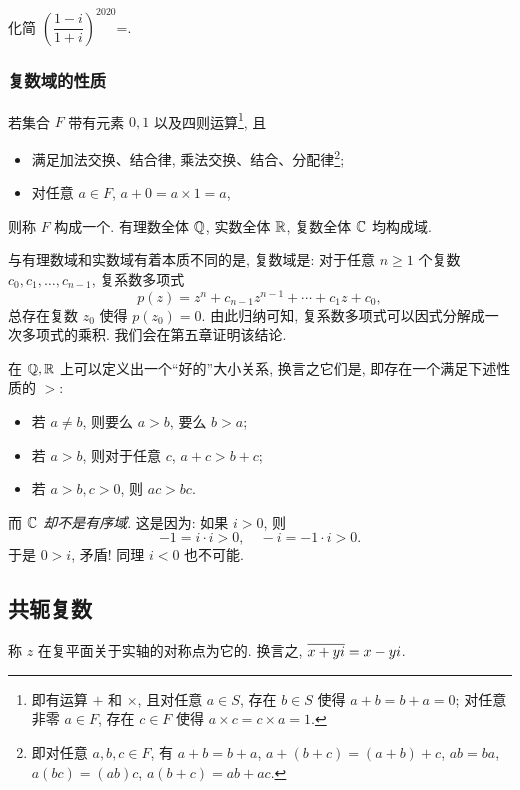 \begin{exercise}
  化简 $\left(\dfrac{1-i}{1+i}\right)^{2020}$=\fillblank{}.
\end{exercise}

\subsubsection{复数域的性质\optional}

若集合 $F$ 带有元素 $0,1$ 以及四则运算\footnote{%
  即有运算 $+$ 和 $\times$, 且对任意 $a\in S$, 存在 $b\in S$ 使得 $a+b=b+a=0$; 对任意非零 $a\in F$, 存在 $c\in F$ 使得 $a\times c=c\times a=1$.%
}, 且
\begin{itemize}
  \item 满足加法交换、结合律, 乘法交换、结合、分配律\footnote{即对任意 $a,b,c\in F$, 有 $a+b=b+a$, $a+(b+c)=(a+b)+c$, $ab=ba$, $a(bc)=(ab)c$, $a(b+c)=ab+ac$.};
  \item 对任意 $a\in F$, $a+0=a\times 1=a$,
\end{itemize}
则称 $F$ 构成一个.
有理数全体 ${\mathbb{Q}}$, 实数全体 ${\mathbb{R}}$, 复数全体 ${\mathbb{C}}$ 均构成域.

与有理数域和实数域有着本质不同的是, 复数域是:
对于任意 $n\ge 1$ 个复数 $c_0,c_1,\dots,c_{n-1}$, 复系数多项式
  \[p(z)=z^n+c_{n-1}z^{n-1}+\cdots+c_1z+c_0,\]
总存在复数 $z_0$ 使得 $p(z_0)=0$.
由此归纳可知, 复系数多项式可以因式分解成一次多项式的乘积.
我们会在第五章证明该结论.

在 ${\mathbb{Q}},{\mathbb{R}}$ 上可以定义出一个``好的''大小关系, 换言之它们是, 即存在一个满足下述性质的 $>$:
\begin{itemize}
  \item 若 $a\neq b$, 则要么 $a>b$, 要么 $b>a$;
  \item 若 $a>b$, 则对于任意 $c$, $a+c>b+c$;
  \item 若 $a>b,c>0$, 则 $ac>bc$.
\end{itemize}
而 \emph{${\mathbb{C}}$ 却不是有序域}.
这是因为: 如果 $i>0$, 则
  \[-1=i\cdot i>0,\quad -i=-1\cdot i>0.\]
于是 $0>i$, 矛盾! 同理 $i<0$ 也不可能.


\subsection{共轭复数}

\begin{definition}
  称 $z$ 在复平面关于实轴的对称点为它的.
换言之, $\overline{x+yi}=x-yi$.
\end{definition}

